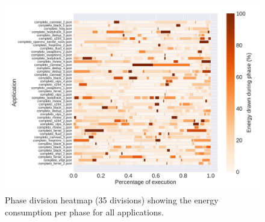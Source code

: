 \begin{figure}[H]
	\includegraphics[width=\columnwidth]{phases/figures/phase_division_cmap_35.pdf}
	\caption{Phase division heatmap (35 divisions) showing the energy consumption per phase for all applications.}
	\label{fig:phase_division_cmap_35}
\end{figure}